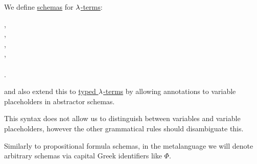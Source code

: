 \begin{definition}\label{def:lambda_term_schema}
  We define \hyperref[con:schemas_and_instances]{schemas} for \hyperref[def:lambda_term]{\( {\mathrm \lambda} \)-terms}:
  \begin{bnf*}
     {}, \\
         {}, \\
       {\bnftsq{\( ( \)} \bnfsp {} \bnfsp {} \bnfsp \bnftsq{\( ) \)}}, \\
       {\bnftsq{\( ( \)} \bnfsp \bnftsq{\( \synlambda \)} \bnfsp {} \bnfsp {} \bnfsp {} \bnfsp \bnftsq{\( ) \)}}, \\
              { \bnfor {} \bnfor {} \bnfor} \\
    .
  \end{bnf*}
  and also extend this to \hyperref[def:typed_lambda_term]{typed \( {\mathrm \lambda} \)-terms} by allowing annotations to variable placeholders in abstractor schemas.
\end{definition}
\begin{comments}
  \item This syntax does not allow us to distinguish between variables and variable placeholders, however the other grammatical rules should disambiguate this.

  \item Similarly to propositional formula schemas, in the metalanguage we will denote arbitrary schemas via capital Greek identifiers like \( \Phi \).
\end{comments}

